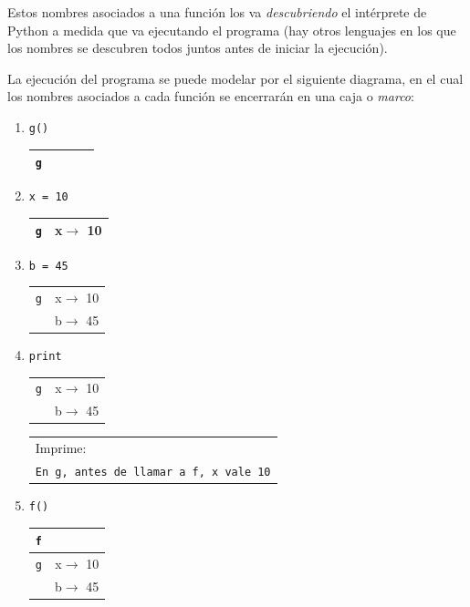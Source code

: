 Estos nombres asociados a una función los va {\it descubriendo} el intérprete de
Python a medida que va ejecutando el programa (hay otros lenguajes en los
que los nombres se descubren todos juntos antes de iniciar la ejecución).

La ejecución del programa se puede modelar por el siguiente diagrama, en el
cual los nombres asociados a cada función se encerrarán en una caja o {\it
marco}:

\begin{enumerate}

\item  \verb|g()   | \hspace{1.5cm}
	\begin{tabular}{r|r|}
	\hline
	\verb|g|&\verb!     !\\
	\hline
	\end{tabular}

\item  \verb|x = 10| \hspace{1.5cm}
	\begin{tabular}{r|r|}
	\hline
	\verb|g|& x$\rightarrow$ 10 \\
	\hline
	\end{tabular}

\item  \verb|b = 45| \hspace{1.5cm}
	\begin{tabular}{r|r|}
	\hline
	\verb|g|& x$\rightarrow$ 10 \\
	        & b$\rightarrow$ 45 \\
	\hline
	\end{tabular}

\item  \verb|print | \hspace{1.5cm}
	\begin{tabular}{r|r|}
	\hline
	\verb|g|& x$\rightarrow$ 10 \\
	             & b$\rightarrow$ 45 \\
	\hline
	\end{tabular}
	\hspace{1cm}
	\begin{tabular}{l}
	Imprime: \\
	{\tt En g, antes de llamar a f, x vale 10}
	\end{tabular}

\item  \verb|f()   | \hspace{1.5cm}
	\begin{tabular}{r|r|}
	\hline
	\verb|f|&\\
	\hline
	\hline
	\verb|g|& x$\rightarrow$ 10 \\
	        & b$\rightarrow$ 45 \\
	\hline
	\end{tabular}


\end{enumerate}
